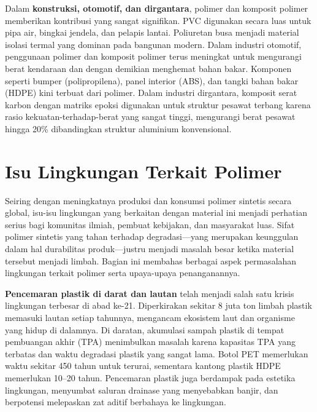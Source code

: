 \documentclass[12pt,a4paper,openany]{book}
\begin{document}
Dalam \textbf{konstruksi, otomotif, dan dirgantara}, polimer dan komposit polimer memberikan kontribusi yang sangat signifikan. PVC digunakan secara luas untuk pipa air, bingkai jendela, dan pelapis lantai. Poliuretan busa menjadi material isolasi termal yang dominan pada bangunan modern. Dalam industri otomotif, penggunaan polimer dan komposit polimer terus meningkat untuk mengurangi berat kendaraan dan dengan demikian menghemat bahan bakar. Komponen seperti bumper (polipropilena), panel interior (ABS), dan tangki bahan bakar (HDPE) kini terbuat dari polimer. Dalam industri dirgantara, komposit serat karbon dengan matriks epoksi digunakan untuk struktur pesawat terbang karena rasio kekuatan-terhadap-berat yang sangat tinggi, mengurangi berat pesawat hingga 20\% dibandingkan struktur aluminium konvensional.


\section{Isu Lingkungan Terkait Polimer}

Seiring dengan meningkatnya produksi dan konsumsi polimer sintetis secara global, isu-isu lingkungan yang berkaitan dengan material ini menjadi perhatian serius bagi komunitas ilmiah, pembuat kebijakan, dan masyarakat luas. Sifat polimer sintetis yang tahan terhadap degradasi---yang merupakan keunggulan dalam hal durabilitas produk---justru menjadi masalah besar ketika material tersebut menjadi limbah. Bagian ini membahas berbagai aspek permasalahan lingkungan terkait polimer serta upaya-upaya penanganannya.

\textbf{Pencemaran plastik di darat dan lautan} telah menjadi salah satu krisis lingkungan terbesar di abad ke-21. Diperkirakan sekitar 8 juta ton limbah plastik memasuki lautan setiap tahunnya, mengancam ekosistem laut dan organisme yang hidup di dalamnya. Di daratan, akumulasi sampah plastik di tempat pembuangan akhir (TPA) menimbulkan masalah karena kapasitas TPA yang terbatas dan waktu degradasi plastik yang sangat lama. Botol PET memerlukan waktu sekitar 450 tahun untuk terurai, sementara kantong plastik HDPE memerlukan 10--20 tahun. Pencemaran plastik juga berdampak pada estetika lingkungan, menyumbat saluran drainase yang menyebabkan banjir, dan berpotensi melepaskan zat aditif berbahaya ke lingkungan.
\end{document}
